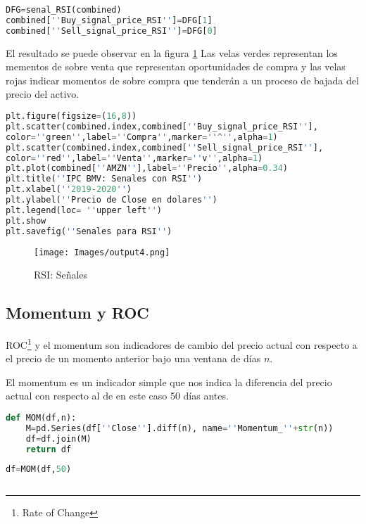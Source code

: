 \documentclass[letterpaper,12pt,oneside]{book}
\begin{document}
\begin{lstlisting}[language=Python]
DFG=senal_RSI(combined)
combined[''Buy_signal_price_RSI'']=DFG[1]
combined[''Sell_signal_price_RSI'']=DFG[0]

\end{lstlisting}


El resultado se puede observar en la figura \ref{fig:m5} Las velas verdes representan los mementos de sobre venta que representan oportunidades de compra y las velas rojas indicar momentos de sobre compra que tenderán a un proceso de bajada del precio del activo.

\begin{lstlisting}[language=Python]
plt.figure(figsize=(16,8))
plt.scatter(combined.index,combined[''Buy_signal_price_RSI''],
color=''green'',label=''Compra'',marker=''^'',alpha=1)
plt.scatter(combined.index,combined[''Sell_signal_price_RSI''],
color=''red'',label=''Venta'',marker=''v'',alpha=1)
plt.plot(combined[''AMZN''],label=''Precio'',alpha=0.34)
plt.title(''IPC BMV: Senales con RSI'')
plt.xlabel(''2019-2020'')
plt.ylabel(''Precio de Close en dolares'')
plt.legend(loc= ''upper left'')
plt.show
plt.savefig(''Senales para RSI'')
\end{lstlisting}

\begin{figure}[ht]
	\centering
	\texttt{[image: Images/output4.png]}
	\caption{RSI: Señales}
	\label{fig:m5}
\end{figure}

\subsection{Momentum y ROC}

ROC\footnote{Rate of Change} y el momentum son indicadores de cambio del precio actual con respecto a el precio de un momento anterior bajo una ventana de días $n$.


El momentum es un indicador simple que nos indica la diferencia del precio actual con respecto al de en este caso 50 días antes.

\begin{lstlisting}[language=Python]
def MOM(df,n):
    M=pd.Series(df[''Close''].diff(n), name=''Momentum_''+str(n))
    df=df.join(M)
    return df
 \end{lstlisting}   
    
\begin{lstlisting}[language=Python]
df=MOM(df,50)
    
\end{lstlisting}   
    
\end{document}
